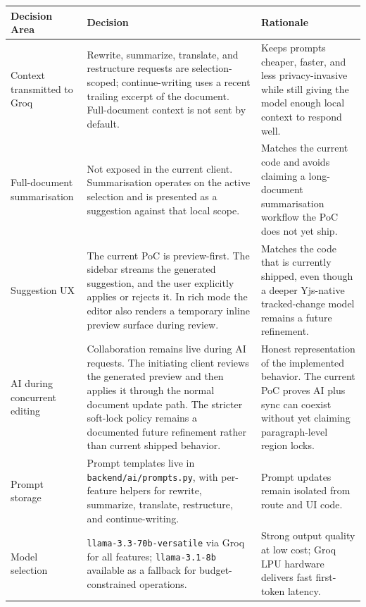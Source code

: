 \documentclass{article}
\begin{document}
\noindent
{\small
\begin{tabularx}{\textwidth}{|>{\hsize=0.5\hsize\raggedright\arraybackslash}X|>{\hsize=0.7\hsize\raggedright\arraybackslash}X|>{\hsize=0.8\hsize\raggedright\arraybackslash}X|}
    \hline
    \rowcolor{tableBlue}
    \textbf{\color{white}Decision Area} &
    \textbf{\color{white}Decision} &
    \textbf{\color{white}Rationale} \\
    \hline
    Context transmitted to Groq & Rewrite, summarize, translate, and restructure requests are selection-scoped; continue-writing uses a recent trailing excerpt of the document. Full-document context is not sent by default. & Keeps prompts cheaper, faster, and less privacy-invasive while still giving the model enough local context to respond well. \\
    \hline
    Full-document summarisation & Not exposed in the current client. Summarisation operates on the active selection and is presented as a suggestion against that local scope. & Matches the current code and avoids claiming a long-document summarisation workflow the PoC does not yet ship. \\
    \hline
    Suggestion UX & The current PoC is preview-first. The sidebar streams the generated suggestion, and the user explicitly applies or rejects it. In rich mode the editor also renders a temporary inline preview surface during review. & Matches the code that is currently shipped, even though a deeper Yjs-native tracked-change model remains a future refinement. \\
    \hline
    AI during concurrent editing & Collaboration remains live during AI requests. The initiating client reviews the generated preview and then applies it through the normal document update path. The stricter soft-lock policy remains a documented future refinement rather than current shipped behavior. & Honest representation of the implemented behavior. The current PoC proves AI plus sync can coexist without yet claiming paragraph-level region locks. \\
    \hline
    Prompt storage & Prompt templates live in \texttt{backend/ai/prompts.py}, with per-feature helpers for rewrite, summarize, translate, restructure, and continue-writing. & Prompt updates remain isolated from route and UI code. \\
    \hline
    Model selection & \texttt{llama-3.3-70b-versatile} via Groq for all features; \texttt{llama-3.1-8b} available as a fallback for budget-constrained operations. & Strong output quality at low cost; Groq LPU hardware delivers fast first-token latency. \\

\end{tabularx}}
\end{document}
